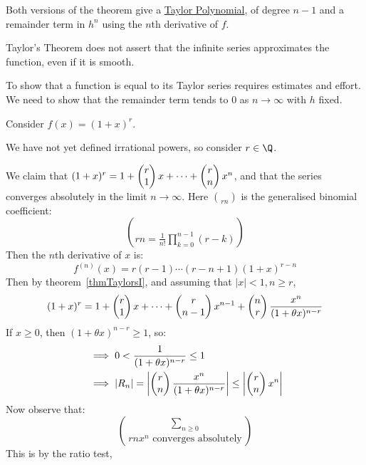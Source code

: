\documentclass[../Main.tex]{subfiles}
\begin{document}
\begin{remarks}
    \item Both versions of the theorem give a \underline{Taylor Polynomial}, of degree $n - 1$ and a remainder term in $h^n$ using the $n$th derivative of $f$.
    \item Taylor's Theorem does not assert that the infinite series approximates the function, even if it is smooth.
    \item To show that a function is equal to its Taylor series requires estimates and effort. We need to show that the remainder term tends to $0$ as $n \to \infty$ with $h$ fixed.
\end{remarks}
\begin{example}
    Consider $f(x) = (1 + x)^r$.\par
    We have not yet defined irrational powers, so consider $r \in \Q$.\par
    We claim that $(1 + x)^r = 1 + \choose{r}{1} x + \cdots + \choose{r}{n} x^n$, and that the series converges absolutely in the limit $n \to \infty$. Here $\choose{r}{n}$ is the generalised binomial coefficient:
    \begin{equation*}
        \choose{r}{n} = \frac{1}{n!} \prod_{k = 0}^{n - 1} (r - k)
    \end{equation*}
    Then the $n$th derivative of $x$ is:
    \begin{equation*}
        f^{(n)}(x) = r(r-1)\cdots(r-n+1)(1+x)^{r-n}
    \end{equation*}
    Then by theorem~\ref{thmTaylorsI}, and assuming that $|x|<1, n \geq r$,
    \begin{equation*}
        (1 + x)^r = 1 + \choose{r}{1} x + \cdots + \choose{r}{n-1}x^{n-1} + \choose{n}{r} \frac{x^n}{(1 + \theta x)^{n-r}}
    \end{equation*}
    If $x \geq 0$, then $(1 + \theta x)^{n-r} \geq 1$, so:
    \begin{align*}
        &\implies 0 < \frac{1}{(1 + \theta x)^{n-r}} \leq 1 \\
        &\implies |R_n| = \left|\choose{r}{n} \frac{x^n}{(1 + \theta x)^{n-r}}\right| \leq \left|\choose{r}{n}x^n\right|
    \end{align*}
    Now observe that:
    \begin{equation*}
        \sum_{n \geq 0} \choose{r}{n}x^n \text{ converges absolutely}
    \end{equation*}
    This is by the ratio test,
    \begin{equation*}

\end{equation*}
\end{example}
\end{document}
